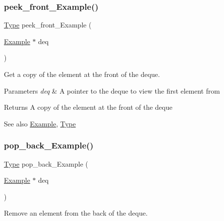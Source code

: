 \subsubsection{\texorpdfstring{peek\+\_\+front\+\_\+\+Example()}{peek\_front\_Example()}}
{\footnotesize\ttfamily \hyperlink{group__DEQUE_gac9c83c2070eb6b5891cf742b90f54c68}{Type} peek\+\_\+front\+\_\+\+Example (\begin{DoxyParamCaption}\item[{\hyperlink{structExample}{Example} $\ast$}]{deq }\end{DoxyParamCaption})}



Get a copy of the element at the front of the deque. 


\begin{DoxyParams}{Parameters}
{\em deq} & A pointer to the deque to view the first element from\\
\hline
\end{DoxyParams}
\begin{DoxyReturn}{Returns}
A copy of the element at the front of the deque
\end{DoxyReturn}
\begin{DoxySeeAlso}{See also}
\hyperlink{structExample}{Example}, \hyperlink{group__DEQUE_gac9c83c2070eb6b5891cf742b90f54c68}{Type} 
\end{DoxySeeAlso}
\mbox{\label{group__DEQUE_gaa3a49a1ed1aac021037fe94820ed8c95}} 
\subsubsection{\texorpdfstring{pop\+\_\+back\+\_\+\+Example()}{pop\_back\_Example()}}
{\footnotesize\ttfamily \hyperlink{group__DEQUE_gac9c83c2070eb6b5891cf742b90f54c68}{Type} pop\+\_\+back\+\_\+\+Example (\begin{DoxyParamCaption}\item[{\hyperlink{structExample}{Example} $\ast$}]{deq }\end{DoxyParamCaption})}



Remove an element from the back of the deque. 


